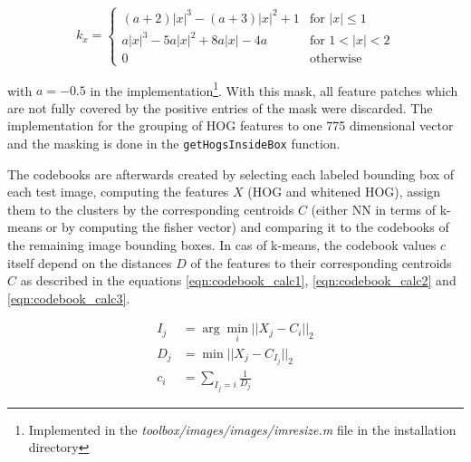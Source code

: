 \begin{equation}
k_x = \begin{cases}
(a+2)|x|^3-(a+3)|x|^2+1 & \text{for } |x| \leq 1 \\
a|x|^3-5a|x|^2+8a|x|-4a & \text{for } 1 < |x| < 2 \\
0                       & \text{otherwise}
\end{cases}
\label{eqn:bicubic_kernel}
\end{equation}

with $a=-0.5$ in the \MATLAB implementation\footnote{Implemented in the \textit{toolbox/images/images/imresize.m} file in the \MATLAB installation directory}. With this mask, all feature patches which are not fully covered by the positive entries of the mask were discarded. The implementation for the grouping of \ac{HOG} features to one 775 dimensional vector and the masking is done in the \verb|getHogsInsideBox| function.
\bigskip

The codebooks are afterwards created by selecting each labeled bounding box of each test image, computing the features $X$ (\ac{HOG} and whitened \ac{HOG}), assign them to the clusters by the corresponding centroids $C$ (either \ac{NN} in terms of k-means or by computing the fisher vector) and comparing it to the codebooks of the remaining image bounding boxes. In cas of k-means, the codebook values $c$ itself depend on the distances $D$ of the features to their corresponding centroids $C$ as described in the equations \ref{eqn:codebook_calc1}, \ref{eqn:codebook_calc2} and \ref{eqn:codebook_calc3}.

%	

\begin{align}
	I_j &= \arg \min_i ||X_j - C_i||_2
	    \label{eqn:codebook_calc1} \\
	D_j &= \min ||X_j - C_{I_j}||_2
	    \label{eqn:codebook_calc2} \\
	c_i &= \sum_{I_j = i} \frac{1}{D_j}
	\label{eqn:codebook_calc3}
\end{align}

